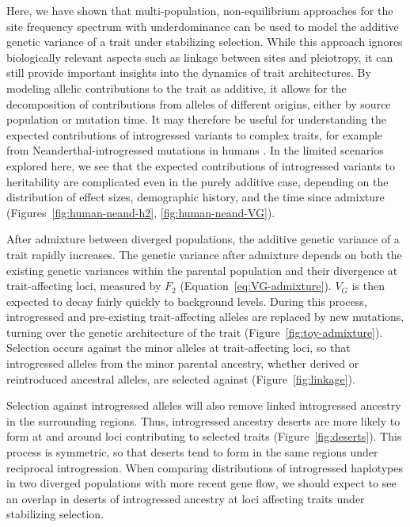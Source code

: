 \documentclass{article}
\begin{document}
Here, we have shown that multi-population, non-equilibrium approaches for the
site frequency spectrum with underdominance can be used to model the additive
genetic variance of a trait under stabilizing selection. While this approach
ignores biologically relevant aspects such as linkage between sites and
pleiotropy, it can still provide important insights into the dynamics of trait
architectures. By modeling allelic contributions to the trait as additive, it
allows for the decomposition of contributions from alleles of different
origins, either by source population or mutation time. It may therefore be
useful for understanding the expected contributions of introgressed variants to
complex traits, for example from Neanderthal-introgressed mutations in humans
\citep{wei2023lingering}. In the limited scenarios explored here, we see that
the expected contributions of introgressed variants to heritability are
complicated even in the purely additive case, depending on the distribution of
effect sizes, demographic history, and the time since admixture
(Figures~\ref{fig:human-neand-h2}, \ref{fig:human-neand-VG}).

After admixture between diverged populations, the additive genetic variance of
a trait rapidly increases. The genetic variance after admixture depends on both
the existing genetic variances within the parental population and their
divergence at trait-affecting loci, measured by $F_2$
(Equation~\ref{eq:VG-admixture}). $V_G$ is then expected to decay fairly
quickly to background levels. During this process, introgressed and
pre-existing trait-affecting alleles are replaced by new mutations, turning
over the genetic architecture of the trait (Figure~\ref{fig:toy-admixture}).
Selection occurs against the minor alleles at trait-affecting loci, so that
introgressed alleles from the minor parental ancestry, whether derived or
reintroduced ancestral alleles, are selected against
(Figure~\ref{fig:linkage}).

Selection against introgressed alleles will also remove linked introgressed
ancestry in the surrounding regions. Thus, introgressed ancestry deserts are
more likely to form at and around loci contributing to selected traits
(Figure~\ref{fig:deserts}). This process is symmetric, so that deserts tend to
form in the same regions under reciprocal introgression. When comparing
distributions of introgressed haplotypes in two diverged populations with more
recent gene flow, we should expect to see an overlap in deserts of introgressed
ancestry at loci affecting traits under stabilizing selection.
\end{document}

